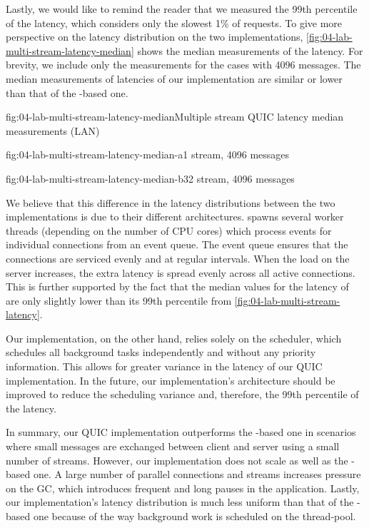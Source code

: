 Lastly, we would like to remind the reader that we measured the 99th percentile of the latency,
which considers only the slowest 1\% of requests. To give more perspective on the latency
distribution on the two implementations, \autoref{fig:04-lab-multi-stream-latency-median} shows the
median measurements of the latency. For brevity, we include only the measurements for the cases with
\SI{4096}{\byte} messages. The median measurements of latencies of our implementation are similar or
lower than that of the \libmsquic{}-based one.

\begin{myFigure}{fig:04-lab-multi-stream-latency-median}{Multiple stream QUIC latency median measurements (LAN)}
\begin{mySubfigure}{0.49\linewidth}{fig:04-lab-multi-stream-latency-median-a}{1 stream, \SI{4096}{\byte} messages}
\footnotesize

\end{mySubfigure}
\begin{mySubfigure}{0.49\linewidth}{fig:04-lab-multi-stream-latency-median-b}{32 stream, \SI{4096}{\byte} messages}
\footnotesize

\end{mySubfigure}
\end{myFigure}

We believe that this difference in the latency distributions between the two implementations is due
to their different architectures. \libmsquic{} spawns several worker threads (depending on the
number of CPU cores) which process events for individual connections from an event queue. The event
queue ensures that the connections are serviced evenly and at regular intervals. When the load on
the server increases, the extra latency is spread evenly across all active connections. This is
further supported by the fact that the median values for the latency of \libmsquic{} are only
slightly lower than its 99th percentile from \autoref{fig:04-lab-multi-stream-latency}.

Our implementation, on the other hand, relies solely on the \dotnet{}  scheduler, which
schedules all background tasks independently and without any priority information. This allows for
greater variance in the latency of our QUIC implementation. In the future, our implementation's
architecture should be improved to reduce the scheduling variance and, therefore, the 99th
percentile of the latency.

In summary, our QUIC implementation outperforms the \libmsquic{}-based one in scenarios where small
messages are exchanged between client and server using a small number of streams. However, our
implementation does not scale as well as the \libmsquic-based one. A large number of parallel
connections and streams increases pressure on the GC, which introduces frequent and long pauses in
the application. Lastly, our implementation's latency distribution is much less uniform than that of
the \libmsquic{}-based one because of the way background work is scheduled on the \dotnet{}
thread-pool.

